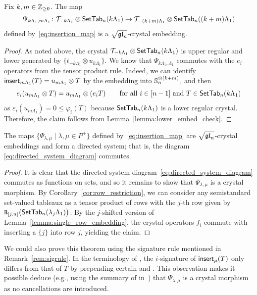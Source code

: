 \documentclass[11pt]{article}
\begin{document}
\begin{lemma}
\label{lemma:single_row_embedding}
Fix $k, m \in \mathbb{Z}_{\geq 0}$. 
The map
\[
\Psi_{k\Lambda_1,m\Lambda_1} \colon \mathcal{T}_{-k\Lambda_1} \otimes  \mathsf{SetTab}_n(k\Lambda_1)  \to \mathcal{T}_{-(k+m)\Lambda_1} \otimes \mathsf{SetTab}_n((k+m) \Lambda_1)
\]
defined by~\eqref{eq:insertion_map} is a $\sqrt{\mathfrak{gl}_n}$-crystal embedding.
\end{lemma}

\begin{proof}
As noted above,
the crystal $\mathcal{T}_{-k\Lambda_1} \otimes \mathsf{SetTab}_n(k\Lambda_1)$ is upper regular and lower generated by $\{t_{-k\Lambda_1} \otimes u_{k\Lambda_1}\}$.
We know that $\Psi_{k\Lambda_1,\Lambda_1}$ commutes with the $e_i$ operators from the tensor product rule.
Indeed, we can identify $\mathsf{insert}_{m\Lambda_1}(T) = u_{m\Lambda_1} \otimes T$ by the embedding into $\mathbb{S}_n^{\otimes (k+m)}$, and then
\[
e_i(u_{m\Lambda_1} \otimes T) = u_{m\Lambda_1} \otimes (e_i T)
\qquad\text{for all $i \in [n-1]$ and $T \in \mathsf{SetTab}_n(k\Lambda_1)$}
\]
as $\varepsilon_i(u_{m\Lambda_1}) = 0 \leq \varphi_i(T)$ because $\mathsf{SetTab}_n(k\Lambda_1)$ is a lower regular crystal.
Therefore, the claim follows from Lemma~\ref{lemma:lower_embed_check}.
\end{proof} 


\begin{theorem}
\label{thm:directed_system}
The maps $\{\Psi_{\lambda,\mu} \mid \lambda,\mu \in P^+\}$ defined by~\eqref{eq:insertion_map} are $\sqrt{\mathfrak{gl}_n}$-crystal embeddings and form a directed system; that is, the diagram \eqref{eq:directed_system_diagram} commutes.
\end{theorem}

\begin{proof}
It is clear that the directed system diagram~\eqref{eq:directed_system_diagram} commutes as functions on sets, and so it remains to show that $\Psi_{\lambda,\mu}$ is a crystal morphism.
By Corollary~\ref{cor:row_restriction}, we can consider any semistandard set-valued tableaux as a tensor product of rows with the $j$-th row given by $\mathtt{R}_{[j,n]}\bigl(\mathsf{SetTab}_n(\lambda_j \Lambda_1) \bigr)$.
By the $j$-shifted version of Lemma~\ref{lemma:single_row_embedding}, the crystal operators $f_i$ commute with inserting a $\{j\}$ into row $j$, yielding the claim.
\end{proof}


\begin{remark}
We could also prove this theorem using the signature rule mentioned in Remark~\ref{rem:sigrule}.
In the terminology of \cite{Yu23}, the $i$-signature of $\mathsf{insert}_\mu(T)$ only differs from that of $T$ by prepending certain  and .
This observation makes it possible deduce (e.g., using the summary of \cite{Yu23} in~\cite[\S2.2]{MTY}) that $\Psi_{\lambda,\mu}$ is a crystal morphism as no cancellations are introduced.
\end{remark}
\end{document}

